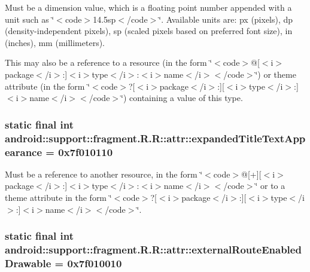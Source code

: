 Must be a dimension value, which is a floating point number appended with a unit such as \char`\"{}$<$code$>$14.5sp$<$/code$>$\char`\"{}. Available units are: px (pixels), dp (density-independent pixels), sp (scaled pixels based on preferred font size), in (inches), mm (millimeters). 

This may also be a reference to a resource (in the form \char`\"{}$<$code$>$@\mbox{[}$<$i$>$package$<$/i$>$:\mbox{]}$<$i$>$type$<$/i$>$:$<$i$>$name$<$/i$>$$<$/code$>$\char`\"{}) or theme attribute (in the form \char`\"{}$<$code$>$?\mbox{[}$<$i$>$package$<$/i$>$:\mbox{]}\mbox{[}$<$i$>$type$<$/i$>$:\mbox{]}$<$i$>$name$<$/i$>$$<$/code$>$\char`\"{}) containing a value of this type. \hypertarget{classandroid_1_1support_1_1fragment_1_1_r_1_1attr_f514b368aa42a98f89589fbf0d252538}{
\subsubsection[{expandedTitleTextAppearance}]{\setlength{\rightskip}{0pt plus 5cm}static final int android::support::fragment.R.R::attr::expandedTitleTextAppearance = 0x7f010110}}
\label{classandroid_1_1support_1_1fragment_1_1_r_1_1attr_f514b368aa42a98f89589fbf0d252538}


Must be a reference to another resource, in the form \char`\"{}$<$code$>$@\mbox{[}+\mbox{]}\mbox{[}$<$i$>$package$<$/i$>$:\mbox{]}$<$i$>$type$<$/i$>$:$<$i$>$name$<$/i$>$$<$/code$>$\char`\"{} or to a theme attribute in the form \char`\"{}$<$code$>$?\mbox{[}$<$i$>$package$<$/i$>$:\mbox{]}\mbox{[}$<$i$>$type$<$/i$>$:\mbox{]}$<$i$>$name$<$/i$>$$<$/code$>$\char`\"{}. \hypertarget{classandroid_1_1support_1_1fragment_1_1_r_1_1attr_fc11e7b4157d56d5bd72cf7acef30fab}{
\subsubsection[{externalRouteEnabledDrawable}]{\setlength{\rightskip}{0pt plus 5cm}static final int android::support::fragment.R.R::attr::externalRouteEnabledDrawable = 0x7f010010}}
\label{classandroid_1_1support_1_1fragment_1_1_r_1_1attr_fc11e7b4157d56d5bd72cf7acef30fab}


